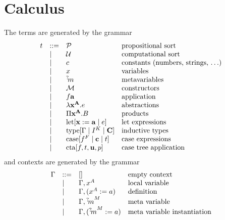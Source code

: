 \section{Calculus}

The terms are generated by the grammar
%
$$
\begin{array}{llll}
    t
    &::=&
    {\cal P}
    &\text{propositional sort}
    \\
    &\mid&
    {\cal U}
    &\text{computational sort}
    \\
    &\mid&
    c
    &\text{constants (numbers, strings, $\ldots$)}
    \\
    &\mid&
    x
    &\text{variables}
    \\
    &\mid&
    {{}^? \kern-0.2em m}
    &\text{metavariables}
    \\
    &\mid&
    {\cal M}
    &\text{constructors}
    \\
    &\mid&
    f {\mathbf a}
    & \text{application}
    \\
    &\mid&
    \lambda {\mathbf x}^{{\mathbf A}}. e
    & \text{abstractions}
    \\
    &\mid&
    \Pi {\mathbf x}^{{\mathbf A}}. B
    & \text{products}
    \\
    &\mid&
    {\text{let}}[{\mathbf x} := {\mathbf a} \mid e]
    & \text{let expressions}
    \\
    &\mid&
    {\text{type}}[\Gamma \mid I^K \mid {\mathbf C}]
    & \text{inductive types}
    \\
    &\mid&
    {\text{case}}[f^F \mid {\mathbf c} \mid t]
    & \text{case expressions}
    \\
    &\mid&
    {\text{cta}}[f, t, {\mathbf u}, p]
    &\text{case tree application}
\end{array}
$$
%
and contexts are generated by the grammar
$$
\begin{array}{llll}
    \Gamma
    &::=&
    []
    &\text{empty context}
    \\
    &\mid&
    \Gamma, x^A
    &\text{local variable}
    \\
    &\mid&
    \Gamma, (x^A := a)
    &\text{definition}
    \\
    &\mid&
    \Gamma, {{}^? \kern-0.2em m}^M
    &\text{meta variable}
    \\
    &\mid&
    \Gamma, ({{}^? \kern-0.2em m}^M := a)
    &\text{meta variable instantiation}
\end{array}
$$
